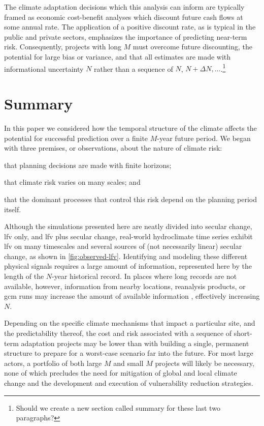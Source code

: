 \documentclass[
]{agujournal2018}
\begin{document}
The climate adaptation decisions which this analysis can inform are typically framed as economic cost-benefit analyses which discount future cash flows at some annual rate.
The application of a positive discount rate, as is typical in the public and private sectors, emphasizes the importance of predicting near-term risk.
Consequently, projects with long $M$ must overcome future discounting, the potential for large bias or variance, and that all estimates are made with informational uncertainty $N$ rather than a sequence of $N$, $N+\Delta N, \ldots$.\footnote{Should we create a new section called summary for these last two paragraphs?}

\section{Summary}

In this paper we considered how the temporal structure of the climate affects the potential for successful prediction over a finite $M$-year future period.
We began with three premises, or observations, about the nature of climate risk:
\begin{enumerate*}[label= (\roman*)]
  \item that planning decisions are made with finite horizons;
  \item that climate risk varies on many scales; and
  \item that the dominant processes that control this risk depend on the planning period itself.
\end{enumerate*}
Although the simulations presented here are neatly divided into secular change, \gls{lfv} only, and \gls{lfv} plus secular change, real-world hydroclimate time series exhibit \gls{lfv} on many timescales and several sources of (not necessarily linear) secular change, as shown in \cref{fig:observed-lfv}.
Identifying and modeling these different physical signals requires a large amount of information, represented here by the length of the $N$-year historical record.
In places where long records are not available, however, information from nearby locations, reanalysis products, or \acrshort{gcm} runs may increase the amount of available information \citep{Merz:2008eh}, effectively increasing $N$.

Depending on the specific climate mechanisms that impact a particular site, and the predictability thereof, the cost and risk associated with a sequence of short-term adaptation projects may be lower than with building a single, permanent structure to prepare for a worst-case scenario far into the future.
For most large actors, a portfolio of both large $M$ and small $M$ projects will likely be necessary, none of which precludes the need for mitigation of global and local climate change and the development and execution of vulnerability reduction strategies.
\end{document}
